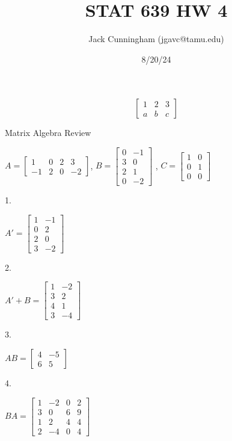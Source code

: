\documentclass[
  letterpaper,
  DIV=11,
  numbers=noendperiod]{scrartcl}
\title{STAT 639 HW 4}
\author{Jack Cunningham (jgavc@tamu.edu)}
\date{8/20/24}
\begin{document}
\maketitle
\ifdefined\Shaded\renewenvironment{Shaded}{\begin{tcolorbox}[frame hidden, enhanced, breakable, interior hidden, boxrule=0pt, borderline west={3pt}{0pt}{shadecolor}, sharp corners]}{\end{tcolorbox}}\fi

\[
\begin{bmatrix}
1&2&3\\
a&b&c
\end{bmatrix}
\]

Matrix Algebra Review

\(A = \begin{bmatrix} 1&0&2&3\\-1&2&0&-2 \end{bmatrix}\),
\(B=\begin{bmatrix} 0&-1\\3&0\\2&1\\0&-2 \end{bmatrix}\) ,
\(C=\begin{bmatrix} 1&0\\0&1\\0&0\end{bmatrix}\)

1.

\(A'= \begin{bmatrix} 1 &-1\\0&2\\2&0\\3&-2\end{bmatrix}\)

2.

\(A'+B=\begin{bmatrix} 1&-2\\3&2\\4&1\\3&-4\end{bmatrix}\)

3.

\(AB=\begin{bmatrix} 4 &-5\\6&5 \end{bmatrix}\)

4.

\(BA=\begin{bmatrix} 1&-2&0&2\\3&0&6&9\\1&2&4&4\\2&-4&0&4\end{bmatrix}\)
\end{document}
